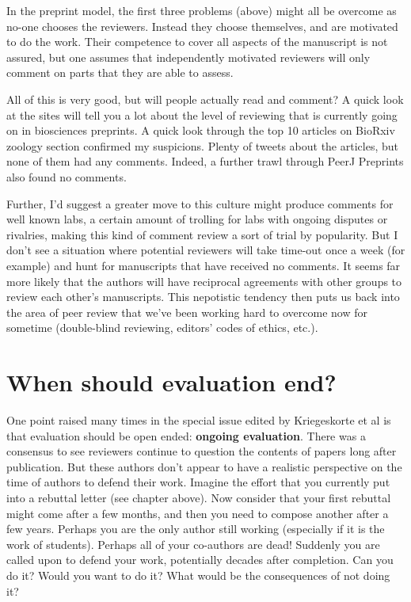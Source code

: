 \documentclass[
]{krantz}
\begin{document}
In the preprint model, the first three problems (above) might all be overcome as no-one chooses the reviewers. Instead they choose themselves, and are motivated to do the work. Their competence to cover all aspects of the manuscript is not assured, but one assumes that independently motivated reviewers will only comment on parts that they are able to assess.

All of this is very good, but will people actually read and comment?
A quick look at the sites will tell you a lot about the level of reviewing that is currently going on in biosciences preprints. A quick look through the top 10 articles on BioRxiv zoology section confirmed my suspicions. Plenty of tweets about the articles, but none of them had any comments. Indeed, a further trawl through PeerJ Preprints also found no comments.

Further, I'd suggest a greater move to this culture might produce comments for well known labs, a certain amount of trolling for labs with ongoing disputes or rivalries, making this kind of comment review a sort of trial by popularity. But I don't see a situation where potential reviewers will take time-out once a week (for example) and hunt for manuscripts that have received no comments. It seems far more likely that the authors will have reciprocal agreements with other groups to review each other's manuscripts. This nepotistic tendency then puts us back into the area of peer review that we've been working hard to overcome now for sometime (double-blind reviewing, editors' codes of ethics, etc.).

\hypertarget{when-should-evaluation-end}{%
\section{When should evaluation end?}\label{when-should-evaluation-end}}

One point raised many times in the special issue edited by Kriegeskorte et al \citeyearpar{kriegeskorte2012emerging} is that evaluation should be open ended: \textbf{ongoing evaluation}. There was a consensus to see reviewers continue to question the contents of papers long after publication. But these authors don't appear to have a realistic perspective on the time of authors to defend their work. Imagine the effort that you currently put into a rebuttal letter (see chapter above). Now consider that your first rebuttal might come after a few months, and then you need to compose another after a few years. Perhaps you are the only author still working (especially if it is the work of students). Perhaps all of your co-authors are dead! Suddenly you are called upon to defend your work, potentially decades after completion. Can you do it? Would you want to do it? What would be the consequences of not doing it?
\end{document}
